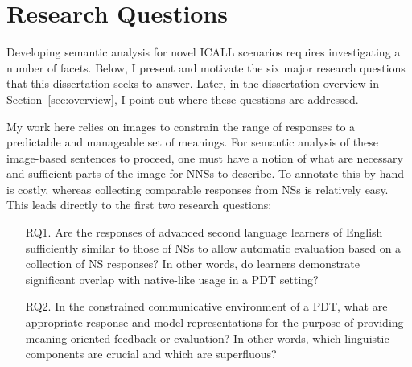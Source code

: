 \section{Research Questions}
\label{sec:RQ}
Developing semantic analysis for novel ICALL scenarios requires investigating a number of facets. Below, I present and motivate the six major research questions that this dissertation seeks to answer. Later, in the dissertation overview in Section~\ref{sec:overview}, I point out where these questions are addressed.

My work here relies on images to constrain the range of responses to a predictable and manageable set of meanings. For semantic analysis of these image-based sentences to proceed, one must have a notion of what are necessary and sufficient parts of the image for NNSs to describe. To annotate this by hand is costly, whereas collecting comparable responses from NSs is relatively easy. This leads directly to the first two research questions:

\begin{itemize}

\item[RQ1.]{Are the responses of advanced second language learners of English sufficiently similar to those of NSs to allow automatic evaluation based on a collection of NS responses? In other words, do learners demonstrate significant overlap with native-like usage in a PDT setting?} %
\end{itemize}

\begin{itemize}
\item[RQ2.]{In the constrained communicative environment of a PDT, what are appropriate response and model representations for the purpose of providing meaning-oriented feedback or evaluation? In other words, which linguistic components are crucial and which are superfluous?}
\end{itemize}

